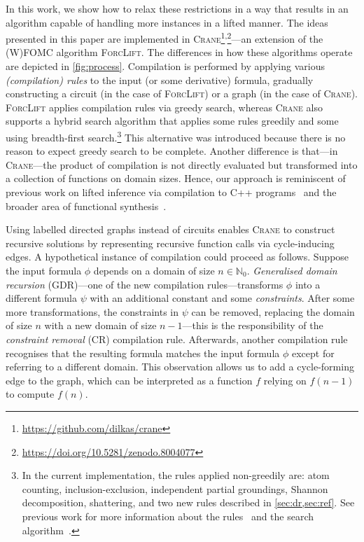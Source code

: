\documentclass{article}
\begin{document}


In this work, we show how to relax these restrictions in a way that results in
an algorithm capable of handling more instances in a lifted manner. The ideas
presented in this paper are implemented in
\textsc{Crane}\footnote{\url{https://github.com/dilkas/crane}}\textsuperscript{,}\footnote{\url{https://doi.org/10.5281/zenodo.8004077}}---an
extension of the (W)FOMC algorithm \textsc{ForcLift}. The differences in how
these algorithms operate are depicted in \cref{fig:process}. Compilation is
performed by applying various \emph{(compilation) rules} to the input (or some
derivative) formula, gradually constructing a circuit (in the case of
\textsc{ForcLift}) or a graph (in the case of \textsc{Crane}). \textsc{ForcLift}
applies compilation rules via greedy search, whereas \textsc{Crane} also
supports a hybrid search algorithm that applies some rules greedily and some
using breadth-first search.\footnote{In the current implementation, the rules
  applied non-greedily are: atom counting, inclusion-exclusion, independent
  partial groundings, Shannon decomposition, shattering, and two new rules
  described in \cref{sec:dr,sec:ref}. See previous work for more information
  about the rules~\cite{DBLP:conf/ijcai/BroeckTMDR11} and the search
  algorithm~\cite{dilkas2023generalising}.} This alternative was introduced
because there is no reason to expect greedy search to be complete. Another
difference is that---in \textsc{Crane}---the product of compilation is not
directly evaluated but transformed into a collection of functions on domain
sizes. Hence, our approach is reminiscent of previous work on lifted inference
via compilation to C++ programs~\cite{DBLP:conf/kr/KazemiP16} and the broader
area of functional
synthesis~\cite{DBLP:conf/cav/GoliaRM20,DBLP:conf/pldi/KuncakMPS10}.


Using labelled directed graphs instead of circuits enables \textsc{Crane} to
construct recursive solutions by representing recursive function calls via
cycle-inducing edges. A hypothetical instance of compilation could proceed as
follows. Suppose the input formula $\phi$ depends on a domain of size
$n \in \mathbb{N}_{0}$. \emph{Generalised domain recursion} (GDR)---one of the
new compilation rules---transforms $\phi$ into a different formula $\psi$ with
an additional constant and some \emph{constraints}. After some more
transformations, the constraints in $\psi$ can be removed, replacing the domain
of size $n$ with a new domain of size $n-1$---this is the responsibility of the
\emph{constraint removal} (CR) compilation rule. Afterwards, another compilation
rule recognises that the resulting formula matches the input formula $\phi$
except for referring to a different domain. This observation allows us to add a
cycle-forming edge to the graph, which can be interpreted as a function $f$
relying on $f(n-1)$ to compute $f(n)$.
\end{document}
